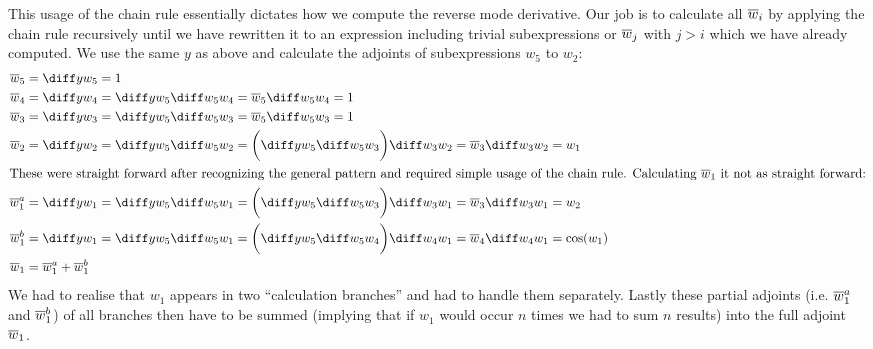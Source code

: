 This usage of the chain rule essentially dictates how we compute the reverse mode derivative. Our job is to calculate all $\overline{w}_{i}$ by applying the chain rule recursively until we have rewritten it to an expression including trivial subexpressions or $\overline{w}_{j}$ with $j > i$ which we have already computed. We use the same $y$ as above and calculate the adjoints of subexpressions $w_5$ to $w_2$:
\yExampleDiff
\begin{align*}
    \overw{5}   & = \diffyw{5} = 1                                                                                                           \\
    \overw{4}   & = \diffyw{4} = \diffyw{5}\diffw{5}{4} = \overw{5}\diffw{5}{4} = 1                                                          \\
    \overw{3}   & = \diffyw{3} = \diffyw{5}\diffw{5}{3} = \overw{5}\diffw{5}{3} = 1                                                          \\
    \overw{2}   & = \diffyw{2} = \diffyw{5}\diffw{5}{2} = \bigg(\diffyw{5}\diffw{5}{3}\bigg)\diffw{3}{2} = \overw{3}\diffw{3}{2} = w_1       \\
    \intertext{These were straight forward after recognizing the general pattern and required simple usage of the chain rule. Calculating $\overw{1}$ it not as straight forward:}
    \overw{1}^a & = \diffyw{1} = \diffyw{5}\diffw{5}{1} = \bigg(\diffyw{5}\diffw{5}{3}\bigg)\diffw{3}{1} = \overw{3}\diffw{3}{1} = w_2       \\
    \overw{1}^b & = \diffyw{1} = \diffyw{5}\diffw{5}{1} = \bigg(\diffyw{5}\diffw{5}{4}\bigg)\diffw{4}{1} = \overw{4}\diffw{4}{1} = \cos(w_1) \\
    \overw{1}   & = \overw{1}^a + \overw{1}^b
\end{align*}
We had to realise that $w_1$ appears in two ``calculation branches'' and had to handle them separately. Lastly these partial adjoints (i.e. $\overline{w}_{1}^a$ and $\overline{w}_{1}^b$) of all branches then have to be summed (implying that if $w_1$ would occur $n$ times we had to sum $n$ results) into the full adjoint $\overline{w}_{1}$.

